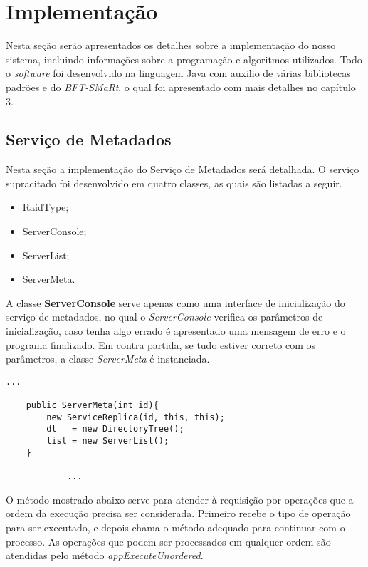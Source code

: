 
\section{Implementação}
Nesta seção serão apresentados os detalhes sobre a implementação do nosso sistema, incluindo informações sobre a programação e algoritmos utilizados. Todo o \textit{software} foi desenvolvido na linguagem Java com auxilio de várias bibliotecas padrões e do \textit{BFT-SMaRt}, o qual foi apresentado com mais detalhes no capítulo 3. 
\\

\subsection{Serviço de Metadados}
Nesta seção a implementação do Serviço de Metadados será detalhada. O serviço supracitado foi desenvolvido em quatro classes, as quais são listadas a seguir.
\\

\begin{itemize}
	\item RaidType;
	\item ServerConsole;
	\item ServerList;
	\item ServerMeta.
\end{itemize}

A classe \textbf{ServerConsole} serve apenas como uma interface de inicialização do serviço de metadados, no qual o \textit{ServerConsole} verifica os parâmetros de inicialização, caso tenha algo errado é apresentado uma mensagem de erro e o programa finalizado. Em contra partida, se tudo estiver correto com os parâmetros, a classe \textit{ServerMeta} é instanciada.
\\
\begin{lstlisting}[basicstyle=\ttfamily\footnotesize, frame=single]	
			...
		
	public ServerMeta(int id){
		new ServiceReplica(id, this, this);
		dt   = new DirectoryTree();
		list = new ServerList(); 
	}

			...
\end{lstlisting}	

O método mostrado abaixo serve para atender à requisição por operações que a ordem da execução precisa ser considerada.
Primeiro recebe o tipo de operação para ser executado, e depois chama o método adequado para continuar com o processo.
As operações que podem ser processados em qualquer ordem são atendidas pelo método \textit{appExecuteUnordered}.

